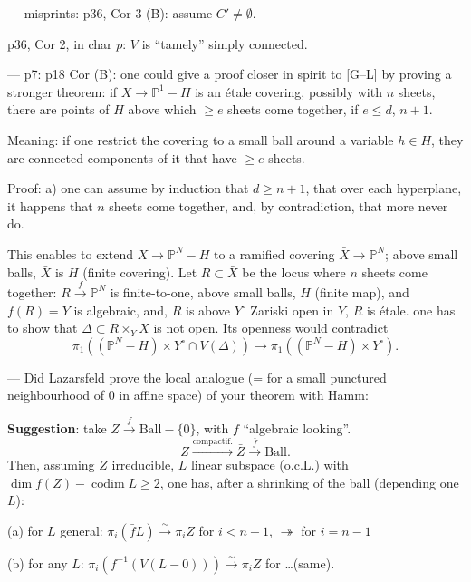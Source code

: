 \documentclass[11pt,a4paper]{article}
\theoremstyle{plain}
\theoremstyle{definition}
\DeclareMathOperator{\codim}{codim}
\begin{document}
\medskip

--- misprints: p36, Cor 3 (B): assume $C' \neq \emptyset$.

p36, Cor 2, in char $p$: $V$ is ``tamely'' simply connected.

\medskip

--- p7: p18 Cor (B): one could give a proof closer in spirit to [G--L] by proving a stronger theorem: if $X \to \mathbb{P}^1 - H$ is an étale covering, possibly with $n$ sheets, there are points of $H$ above which $\geq e$ sheets come together, if $e \leq d$, $n+1$.

Meaning: if one restrict the covering to a small ball around a variable $h \in H$, they are connected components of it that have $\geq e$ sheets.

\newpage

Proof: a) one can assume by induction that $d \geq n+1$, that over each hyperplane, it happens that $n$ sheets come together, and, by contradiction, that more never do.

This enables to extend $X \to \mathbb{P}^N - H$ to a ramified covering $\bar{X} \to \mathbb{P}^N$; above small balls, $\bar{X}$ is $H$ (finite covering). Let $R \subset \bar{X}$ be the locus where $n$ sheets come together: $R \xrightarrow{f} \mathbb{P}^N$ is finite-to-one, above small balls, $H$ (finite map), and $f(R) = Y$ is algebraic, and, $R$ is above $Y^\circ$ Zariski open in $Y$, $R$ is étale. one has to show that $\Delta \subset R \times_Y X$ is not open. Its openness would contradict
\[
\pi_1((\mathbb{P}^N - H) \times Y^\circ \cap V(\Delta)) \longrightarrow \pi_1((\mathbb{P}^N - H) \times Y^\circ).
\]

\medskip

--- Did Lazarsfeld prove the local analogue (= for a small punctured neighbourhood of $0$ in affine space) of your theorem with Hamm:

\medskip

\noindent \textbf{Suggestion}: take $Z \xrightarrow{f} \text{Ball} - \{0\}$, with $f$ ``algebraic looking''.
\[
Z \xrightarrow{\text{compactif.}} \bar{Z} \xrightarrow{\bar{f}} \text{Ball}.
\]
Then, assuming $Z$ irreducible, $L$ linear subspace (o.c.L.) with $\dim f(Z) - \codim L \geq 2$, one has, after a shrinking of the ball (depending one $L$):

(a) for $L$ general: $\pi_i(\bar{f}L) \xrightarrow{\sim} \pi_i Z$ for $i < n-1$, $\twoheadrightarrow$ for $i = n-1$

(b) for any $L$: $\pi_i(f^{-1}(V(L - 0))) \xrightarrow{\sim} \pi_i Z$ for \ldots (same).
\end{document}
